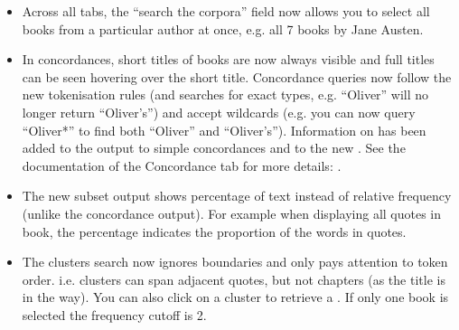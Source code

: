 \documentclass[letterpaper,10pt,english]{sphinxmanual}
\begin{document}
\begin{itemize}
\begin{enumerate}
\end{enumerate}

\sphinxAtStartPar
Also see the explanation of the Concordance tab
{\hyperref[\detokenize{clicanalysis/concordance:search-the-corpora}]{}}. More examples and the detailed technical
documentation of the tokenizer is available from
.

\item {} 
\sphinxAtStartPar
{}

\sphinxAtStartPar
Across all tabs, the “search the corpora” field now allows you to
select all books from a particular author at once, e.g. all 7 books
by Jane Austen.

\item {} 
\sphinxAtStartPar
{}

\sphinxAtStartPar
In concordances, short titles of books are now always visible and full
titles can be seen hovering over the short title. Concordance queries
now follow the new tokenisation rules (and searches for exact types,
e.g. “Oliver” will no longer return “Oliver’s”) and accept wildcards
(e.g. you can now query “Oliver*” to find both “Oliver” and
“Oliver’s”). Information on  has been added to
the output to simple concordances and to the new . See the documentation of the Concordance tab for more details:
{\hyperref[\detokenize{clicanalysis/concordance:concordance}]{}}.

\item {} 
\sphinxAtStartPar
{}

\sphinxAtStartPar
The new subset output shows percentage of text instead of relative
frequency (unlike the concordance output). For example when displaying
all quotes in book, the percentage indicates the proportion of the
words in quotes.

\item {} 
\sphinxAtStartPar
{}

\sphinxAtStartPar
The clusters search now ignores boundaries and only pays attention to
token order. i.e. clusters can span adjacent quotes, but not chapters
(as the title is in the way). You can also click on a cluster to
retrieve a . If only one book is
selected the frequency cutoff is 2.


\end{itemize}
\end{document}
